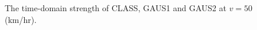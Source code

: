 \documentclass[12pt, draftclsnofoot, onecolumn]{IEEEtran}
\begin{document}
\begin{figure}[t]
\centering
{}
\caption{The time-domain strength of CLASS, GAUS1 and GAUS2 at $v=50$ (km/hr).}\label{fig:strength_scatterings}
\end{figure}
\end{document}
